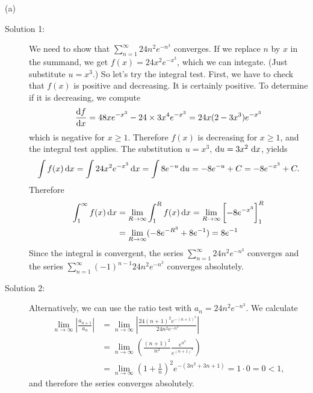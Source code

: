 \begin{solution} (a)
\begin{description}
\item[Solution 1:]
We need to show that
$\sum\limits_{n=1}^\infty 24n^2 e^{-n^3}$ converges.
If we replace $n$ by $x$ in the summand, we get $f(x) = 24x^2 e^{-x^3}$,
which we can integate. (Just substitute $u=x^3$.)
So let's try the integral test.
First, we have to check that $f(x)$ is positive and decreasing.
It is certainly positive. To determine if it is decreasing, we compute
\begin{align*}
\diff{f}{x} = 48x e^{-x^3} - 24\times 3 x^4 e^{-x^3}
= 24x (2-3x^3) e^{-x^3}
\end{align*}
which is negative for $x\ge1$. Therefore $f(x)$ is decreasing for $x\ge1$,
and the integral test applies. The substitution $u=x^3$,
$\mathrm{d}u=3x^2\,\,\mathrm{d}x$, yields
\begin{align*}
\int f(x) \,\mathrm{d}x
= \int 24x^2 e^{-x^3} \,\mathrm{d}x = \int 8 e^{-u}\,\mathrm{d}u = -8e^{-u} + C = -8e^{-x^3} + C.
\end{align*}
Therefore
\begin{align*}
\int_1^\infty f(x) \,\mathrm{d}x &= \lim_{R \to \infty} \int_1^R f(x) \,\mathrm{d}x
  = \lim_{R \to \infty} \bigg[ {-}8 e^{-x^3} \bigg]_1^R  \\
   &= \lim_{R \to \infty} ( - 8 e^{-R^3} + 8 e^{-1}  ) = 8 e^{-1}
\end{align*}
Since the integral is convergent, the series
$\sum\limits_{n=1}^\infty 24n^2 e^{-n^3}$ converges
and the series $\displaystyle \sum_{n=1}^\infty (-1)^{n-1}24n^2 e^{-n^3}$
converges absolutely.

\item[Solution 2:]
Alternatively, we can use the ratio test with $a_n=24n^2 e^{-n^3}$.
We calculate
\begin{align*}
\lim_{n\to\infty} \left|\frac{a_{n+1}}{a_n}\right|
&= \lim_{n\to\infty} \left|\frac{24 (n+1)^2e^{-(n+1)^3}}{24 n^2e^{-n^3}} \right| \\
&= \lim_{n\to\infty} \left( \frac{(n+1)^2}{n^2} \frac{e^{n^3}}{e^{(n+1)^3}} \right) \\
&= \lim_{n\to\infty} \left(1+\frac{1}{n}\right)^2 e^{-(3n^2+3n+1)} = 1\cdot0=0 < 1,
\end{align*}
and therefore the series converges absolutely.


\end{description}
\end{solution}
